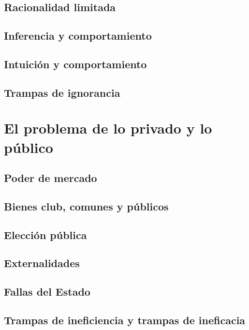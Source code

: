 \documentclass[12pt]{book}
\begin{document}
\section{Racionalidad limitada}

\section{Inferencia y comportamiento}

\section{Intuición y comportamiento}

\section{Trampas de ignorancia}

\chapter{El problema de lo privado y lo público}



\section{Poder de mercado}

\section{Bienes club, comunes y públicos}

\section{Elección pública}

\section{Externalidades}



\section{Fallas del Estado}

\section{Trampas de ineficiencia y trampas de ineficacia}
\end{document}
